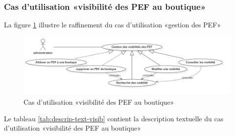 \subsubsection{Cas d’utilisation «visibilité des PEF au boutique»}
La figure \ref{fig:usecase-gestion-visibilite} illustre le raffinement du cas d’utilisation «gestion des PEF»

\begin{figure}[H]
	\centering
	\includegraphics[width=1\linewidth]{"img/conception/usecases/sprint 3/usecase-gestion-visibilite"}
	\caption[Cas d’utilisation «visibilité des PEF au boutique»]{Cas d’utilisation «visibilité des PEF au boutique»}
	\label{fig:usecase-gestion-visibilite}
\end{figure}

Le tableau \ref{tab:descrip-text-visib} contient la description textuelle du cas d’utilisation «visibilité des PEF au boutique»

